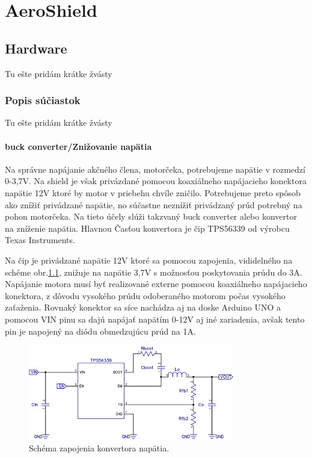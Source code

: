 \chapter{AeroShield}

\section{Hardware}

Tu ešte pridám krátke žvásty 

\subsection{Popis súčiastok}

Tu ešte pridám krátke žvásty 

\subsubsection{buck converter/Znižovanie napätia}

Na správne napájanie akčného člena, motorčeka, potrebujeme napätie v rozmedzí 0-3,7V. Na shield je však privázdané pomocou koaxiálneho napájacieho konektora napätie 12V ktoré by motor v priebehu chvíle zničilo. Potrebujeme preto spôsob ako znížiť privádzané napätie, no súčastne neznížiť privádzaný prúd potrebný na pohon motorčeka. Na tieto účely slúži takzvaný buck converter alebo konvertor na zníženie napätia. Hlavnou Časťou konvertora je čip TPS56339 od výrobcu Texas Instruments.

 Na čip je privádzané napätie 12V ktoré sa pomocou zapojenia, vididelného na schéme obr.\ref{OBRAZOK 2.1}, znižuje na napätie 3,7V s možnosťou poskytovania prúdu do 3A. Napájanie motora musí byť realizované externe pomocou koaxiálneho napájacieho konektora, z dôvodu vysokého prúdu odoberaného motorom počas vysokého zaťaženia. Rovnaký konektor sa síce nachádza aj na doske Arduino UNO a pomocou VIN pinu sa dajú napájať napätím 0-12V aj iné zariadenia, avšak tento pin je napojený na diódu obmedzujúcu prúd na 1A\cite{ampere}\cite{ampere2}.  

\begin{figure}[!tbh]
\centering
\includegraphics[width=90mm]{obr/schemaBuck.png}
\caption{Schéma zapojenia konvertora napätia.}\label{OBRAZOK 2.1}
\end{figure}

